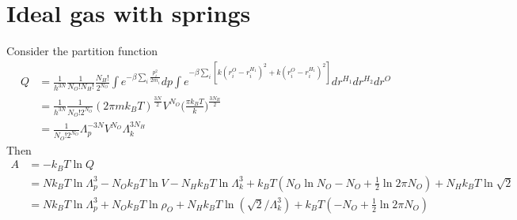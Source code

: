 \documentclass[aps,pre,a4paper,showkeys,fleqn]{revtex4}
\begin{document}
\section{Ideal gas with springs}
Consider the partition function
\begin{align*}
  Q
  &=
    \frac{1}{h^{3N}}\frac{1}{N_O! N_H!}
    \frac{N_H!}{2^{N_O}}
    \int e^{-\beta\sum_i\frac{p_i^2}{2m_i}} dp
    \int e^{-\beta \sum_i [k(r^O_i-r^{H_1}_i)^2 + k(r^O_i-r^{H_1}_i)^2]} dr^{H_1}dr^{H_2} dr^O\\
  &=
    \frac{1}{h^{3N}}\frac{1}{N_O! 2^{N_O}}
    (2\pi m k_BT)^{\frac{3N}{2}}
    V^{N_O}
    \Big(\frac{\pi k_BT}{k}\Big)^{\frac{3N_H}2} \\
  &=
    \frac{1}{N_O! 2^{N_O}}
    \Lambda_p^{-3N}
    V^{N_O}
    \Lambda_k^{3N_H}
\end{align*}
Then
\begin{align*}
  A
  &=
    -k_BT\ln Q\\
  &=
    Nk_BT\ln \Lambda_p^3
    -N_Ok_BT\ln V
    -N_Hk_BT\ln\Lambda_k^3 
    + k_BT(N_O\ln N_O - N_O + \frac12\ln 2\pi N_O)
    + N_H k_BT\ln \sqrt2 \\
  &=
    Nk_BT\ln \Lambda_p^3
    + N_Ok_BT\ln\rho_O
    + N_Hk_BT\ln(\sqrt2/\Lambda_k^3)
    + k_BT( - N_O + \frac12\ln 2\pi N_O)
\end{align*}


{}

\end{document}
